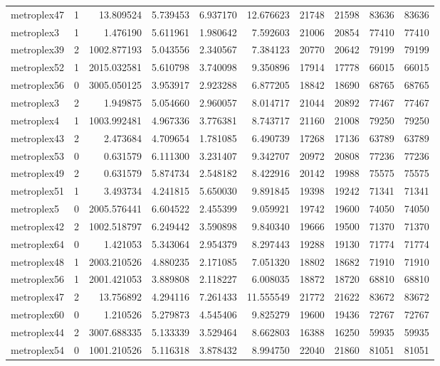 \begin{longtable}{|l|r|r|r|r|r|r|r|r|r|}
metroplex47 & 1 & 13.809524 & 5.739453 & 6.937170 & 12.676623 & 21748 & 21598 & 83636 & 83636 \\
metroplex3 & 1 & 1.476190 & 5.611961 & 1.980642 & 7.592603 & 21006 & 20854 & 77410 & 77410 \\
metroplex39 & 2 & 1002.877193 & 5.043556 & 2.340567 & 7.384123 & 20770 & 20642 & 79199 & 79199 \\
metroplex52 & 1 & 2015.032581 & 5.610798 & 3.740098 & 9.350896 & 17914 & 17778 & 66015 & 66015 \\
metroplex56 & 0 & 3005.050125 & 3.953917 & 2.923288 & 6.877205 & 18842 & 18690 & 68765 & 68765 \\
metroplex3 & 2 & 1.949875 & 5.054660 & 2.960057 & 8.014717 & 21044 & 20892 & 77467 & 77467 \\
metroplex4 & 1 & 1003.992481 & 4.967336 & 3.776381 & 8.743717 & 21160 & 21008 & 79250 & 79250 \\
metroplex43 & 2 & 2.473684 & 4.709654 & 1.781085 & 6.490739 & 17268 & 17136 & 63789 & 63789 \\
metroplex53 & 0 & 0.631579 & 6.111300 & 3.231407 & 9.342707 & 20972 & 20808 & 77236 & 77236 \\
metroplex49 & 2 & 0.631579 & 5.874734 & 2.548182 & 8.422916 & 20142 & 19988 & 75575 & 75575 \\
metroplex51 & 1 & 3.493734 & 4.241815 & 5.650030 & 9.891845 & 19398 & 19242 & 71341 & 71341 \\
metroplex5 & 0 & 2005.576441 & 6.604522 & 2.455399 & 9.059921 & 19742 & 19600 & 74050 & 74050 \\
metroplex42 & 2 & 1002.518797 & 6.249442 & 3.590898 & 9.840340 & 19666 & 19500 & 71370 & 71370 \\
metroplex64 & 0 & 1.421053 & 5.343064 & 2.954379 & 8.297443 & 19288 & 19130 & 71774 & 71774 \\
metroplex48 & 1 & 2003.210526 & 4.880235 & 2.171085 & 7.051320 & 18802 & 18682 & 71910 & 71910 \\
metroplex56 & 1 & 2001.421053 & 3.889808 & 2.118227 & 6.008035 & 18872 & 18720 & 68810 & 68810 \\
metroplex47 & 2 & 13.756892 & 4.294116 & 7.261433 & 11.555549 & 21772 & 21622 & 83672 & 83672 \\
metroplex60 & 0 & 1.210526 & 5.279873 & 4.545406 & 9.825279 & 19600 & 19436 & 72767 & 72767 \\
metroplex44 & 2 & 3007.688335 & 5.133339 & 3.529464 & 8.662803 & 16388 & 16250 & 59935 & 59935 \\
metroplex54 & 0 & 1001.210526 & 5.116318 & 3.878432 & 8.994750 & 22040 & 21860 & 81051 & 81051 \\

\end{longtable}
